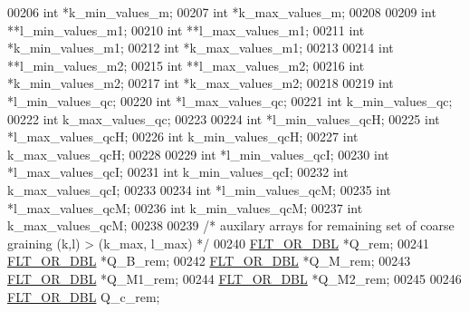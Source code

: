 \begin{DoxyCode}
00206   \textcolor{keywordtype}{int}             *k\_min\_values\_m;
00207   \textcolor{keywordtype}{int}             *k\_max\_values\_m;
00208 
00209   \textcolor{keywordtype}{int}             **l\_min\_values\_m1;
00210   \textcolor{keywordtype}{int}             **l\_max\_values\_m1;
00211   \textcolor{keywordtype}{int}             *k\_min\_values\_m1;
00212   \textcolor{keywordtype}{int}             *k\_max\_values\_m1;
00213 
00214   \textcolor{keywordtype}{int}             **l\_min\_values\_m2;
00215   \textcolor{keywordtype}{int}             **l\_max\_values\_m2;
00216   \textcolor{keywordtype}{int}             *k\_min\_values\_m2;
00217   \textcolor{keywordtype}{int}             *k\_max\_values\_m2;
00218 
00219   \textcolor{keywordtype}{int}             *l\_min\_values\_qc;
00220   \textcolor{keywordtype}{int}             *l\_max\_values\_qc;
00221   \textcolor{keywordtype}{int}             k\_min\_values\_qc;
00222   \textcolor{keywordtype}{int}             k\_max\_values\_qc;
00223 
00224   \textcolor{keywordtype}{int}             *l\_min\_values\_qcH;
00225   \textcolor{keywordtype}{int}             *l\_max\_values\_qcH;
00226   \textcolor{keywordtype}{int}             k\_min\_values\_qcH;
00227   \textcolor{keywordtype}{int}             k\_max\_values\_qcH;
00228 
00229   \textcolor{keywordtype}{int}             *l\_min\_values\_qcI;
00230   \textcolor{keywordtype}{int}             *l\_max\_values\_qcI;
00231   \textcolor{keywordtype}{int}             k\_min\_values\_qcI;
00232   \textcolor{keywordtype}{int}             k\_max\_values\_qcI;
00233 
00234   \textcolor{keywordtype}{int}             *l\_min\_values\_qcM;
00235   \textcolor{keywordtype}{int}             *l\_max\_values\_qcM;
00236   \textcolor{keywordtype}{int}             k\_min\_values\_qcM;
00237   \textcolor{keywordtype}{int}             k\_max\_values\_qcM;
00238 
00239   \textcolor{comment}{/* auxilary arrays for remaining set of coarse graining (k,l) > (k\_max, l\_max) */}
00240   \mbox{\hyperlink{group__data__structures_ga31125aeace516926bf7f251f759b6126}{FLT\_OR\_DBL}}      *Q\_rem;
00241   \mbox{\hyperlink{group__data__structures_ga31125aeace516926bf7f251f759b6126}{FLT\_OR\_DBL}}      *Q\_B\_rem;
00242   \mbox{\hyperlink{group__data__structures_ga31125aeace516926bf7f251f759b6126}{FLT\_OR\_DBL}}      *Q\_M\_rem;
00243   \mbox{\hyperlink{group__data__structures_ga31125aeace516926bf7f251f759b6126}{FLT\_OR\_DBL}}      *Q\_M1\_rem;
00244   \mbox{\hyperlink{group__data__structures_ga31125aeace516926bf7f251f759b6126}{FLT\_OR\_DBL}}      *Q\_M2\_rem;
00245 
00246   \mbox{\hyperlink{group__data__structures_ga31125aeace516926bf7f251f759b6126}{FLT\_OR\_DBL}}      Q\_c\_rem;

\end{DoxyCode}
